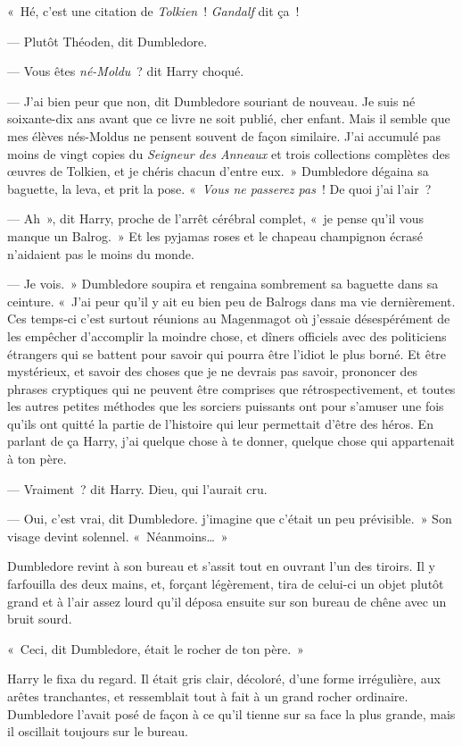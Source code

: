 «~Hé, c'est une citation de \emph{Tolkien}~! \emph{Gandalf} dit ça~!

--- Plutôt Théoden, dit Dumbledore.

--- Vous êtes \emph{né-Moldu}~? dit Harry choqué.

--- J'ai bien peur que non, dit Dumbledore souriant de nouveau. Je suis né soixante-dix ans avant que ce livre ne soit publié, cher enfant. Mais il semble que mes élèves nés-Moldus ne pensent souvent de façon similaire. J'ai accumulé pas moins de vingt copies du \emph{Seigneur des Anneaux} et trois collections complètes des œuvres de Tolkien, et je chéris chacun d'entre eux.~» Dumbledore dégaina sa baguette, la leva, et prit la pose. «~\emph{Vous ne passerez pas}~! De quoi j'ai l'air~?

--- Ah~», dit Harry, proche de l'arrêt cérébral complet, «~je pense qu'il vous manque un Balrog.~» Et les pyjamas roses et le chapeau champignon écrasé n'aidaient pas le moins du monde.

--- Je vois.~» Dumbledore soupira et rengaina sombrement sa baguette dans sa ceinture. «~J'ai peur qu'il y ait eu bien peu de Balrogs dans ma vie dernièrement. Ces temps-ci c'est surtout réunions au Magenmagot où j'essaie désespérément de les empêcher d'accomplir la moindre chose, et dîners officiels avec des politiciens étrangers qui se battent pour savoir qui pourra être l'idiot le plus borné. Et être mystérieux, et savoir des choses que je ne devrais pas savoir, prononcer des phrases cryptiques qui ne peuvent être comprises que rétrospectivement, et toutes les autres petites méthodes que les sorciers puissants ont pour s'amuser une fois qu'ils ont quitté la partie de l'histoire qui leur permettait d'être des héros. En parlant de ça Harry, j'ai quelque chose à te donner, quelque chose qui appartenait à ton père.

--- Vraiment~? dit Harry. Dieu, qui l'aurait cru.

--- Oui, c'est vrai, dit Dumbledore. j'imagine que c'était un peu prévisible.~» Son visage devint solennel. «~Néanmoins…~»

Dumbledore revint à son bureau et s'assit tout en ouvrant l'un des tiroirs. Il y farfouilla des deux mains, et, forçant légèrement, tira de celui-ci un objet plutôt grand et à l'air assez lourd qu'il déposa ensuite sur son bureau de chêne avec un bruit sourd.

«~Ceci, dit Dumbledore, était le rocher de ton père.~»

Harry le fixa du regard. Il était gris clair, décoloré, d'une forme irrégulière, aux arêtes tranchantes, et ressemblait tout à fait à un grand rocher ordinaire. Dumbledore l'avait posé de façon à ce qu'il tienne sur sa face la plus grande, mais il oscillait toujours sur le bureau.

